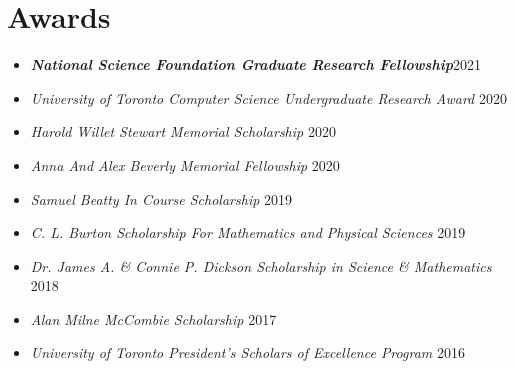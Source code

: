 \documentclass{article}
\begin{document}
%


    \section{Awards}
    \begin{itemize}
     \setlength\itemsep{1.2ex}
    	\item \textbf{\textsl{National Science Foundation Graduate Research Fellowship}}\hfill 2021
        \item \textsl{University of Toronto Computer Science Undergraduate Research Award} \hfill 2020
        \item \textsl{Harold Willet Stewart Memorial Scholarship} \hfill 2020
        \item \textsl{Anna And Alex Beverly Memorial Fellowship} \hfill 2020
        \item \textsl{Samuel Beatty In Course Scholarship} \hfill 2019
        \item \textsl{C. L. Burton Scholarship For Mathematics and Physical Sciences} \hfill 2019
        \item \textsl{Dr. James A. \& Connie P. Dickson Scholarship in Science \& Mathematics} \hfill 2018
        \item \textsl{Alan Milne McCombie Scholarship} \hfill 2017
        \item \textsl{University of Toronto President's Scholars of Excellence Program} \hfill 2016
    \end{itemize}
\end{document}
